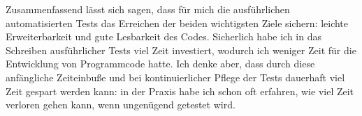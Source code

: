 Zusammenfassend lässt sich sagen, dass für mich die ausführlichen automatisierten Tests das Erreichen der beiden wichtigsten Ziele sichern: leichte Erweiterbarkeit und gute Lesbarkeit des Codes. Sicherlich habe ich in das Schreiben ausführlicher Tests viel Zeit investiert, wodurch ich weniger Zeit für die Entwicklung von Programmcode hatte. Ich denke aber, dass durch diese anfängliche Zeiteinbuße und bei kontinuierlicher Pflege der Tests dauerhaft viel Zeit gespart werden kann: in der Praxis habe ich schon oft erfahren, wie viel Zeit verloren gehen kann, wenn ungenügend getestet wird.